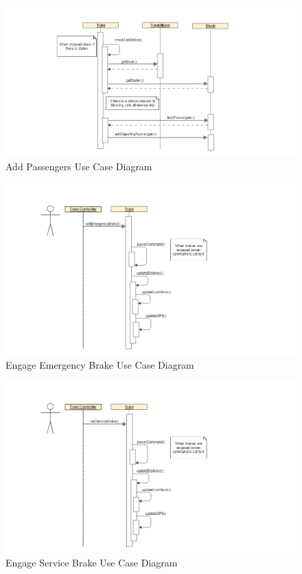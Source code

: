 \documentclass[]{article}
\begin{document}
\begin{figure}[H]
	\centering
	\includegraphics[scale=.5]{train_model_sqd_add_passengers.png}
	\caption{Add Passengers Use Case Diagram}
\end{figure}

\begin{figure}[H]
	\centering
	\includegraphics[scale=.5]{train_model_sqd_engage_emergency_brake.png}
	\caption{Engage Emergency Brake Use Case Diagram}
\end{figure}

\begin{figure}[H]
	\centering
	\includegraphics[scale=.5]{train_model_sqd_engage_service_brake.png}
	\caption{Engage Service Brake Use Case Diagram}
\end{figure}
\end{document}
